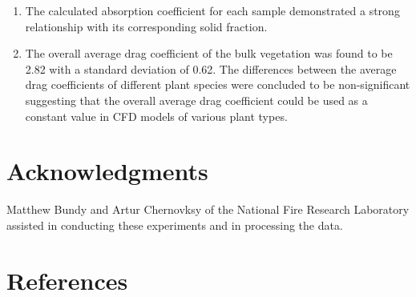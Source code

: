 \documentclass[12pt]{article}
\begin{document}
\begin{enumerate}
  \item The calculated absorption coefficient for each sample demonstrated a strong relationship with its corresponding solid fraction. 
  \item The overall average drag coefficient of the bulk vegetation was found to be 2.82 with a standard deviation of 0.62. The differences between the average drag coefficients of different plant species were concluded to be non-significant suggesting that the overall average drag coefficient could be used as a constant value in CFD models of various plant types.  
\end{enumerate}

\section*{Acknowledgments}

\noindent Matthew Bundy and Artur Chernovksy of the National Fire Research Laboratory assisted in conducting these experiments and in processing the data.   \\
\pagebreak
\section*{References}



\end{document}
